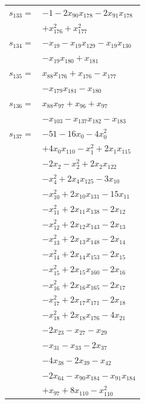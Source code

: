 \begin{longtable}{@{}r@{\;}l@{}}
\(s_{133}=\) & \(\displaystyle -1 -2x_{90}x_{178} -2x_{91}x_{178}\) \\
 & \(\displaystyle +x_{176}^{2} +x_{177}^{2}\) \\[3pt]
\(s_{134}=\) & \(\displaystyle -x_{19} -x_{19}x_{129} -x_{19}x_{130}\) \\
 & \(\displaystyle -x_{19}x_{180} +x_{181}\) \\[3pt]
\(s_{135}=\) & \(\displaystyle x_{88}x_{176} +x_{176} -x_{177}\) \\
 & \(\displaystyle -x_{179}x_{181} -x_{180}\) \\[3pt]
\(s_{136}=\) & \(\displaystyle x_{88}x_{97} +x_{96} +x_{97}\) \\
 & \(\displaystyle -x_{103} -x_{137}x_{182} -x_{183}\) \\[3pt]
\(s_{137}=\) & \(\displaystyle -51 -16x_{0} -4x_{0}^{2}\) \\
 & \(\displaystyle +4x_{0}x_{110} -x_{1}^{2} +2x_{1}x_{115}\) \\
 & \(\displaystyle -2x_{2} -x_{2}^{2} +2x_{2}x_{122}\) \\
 & \(\displaystyle -x_{4}^{2} +2x_{4}x_{125} -3x_{10}\) \\
 & \(\displaystyle -x_{10}^{2} +2x_{10}x_{131} -15x_{11}\) \\
 & \(\displaystyle -x_{11}^{2} +2x_{11}x_{138} -2x_{12}\) \\
 & \(\displaystyle -x_{12}^{2} +2x_{12}x_{143} -2x_{13}\) \\
 & \(\displaystyle -x_{13}^{2} +2x_{13}x_{148} -2x_{14}\) \\
 & \(\displaystyle -x_{14}^{2} +2x_{14}x_{153} -2x_{15}\) \\
 & \(\displaystyle -x_{15}^{2} +2x_{15}x_{160} -2x_{16}\) \\
 & \(\displaystyle -x_{16}^{2} +2x_{16}x_{165} -2x_{17}\) \\
 & \(\displaystyle -x_{17}^{2} +2x_{17}x_{171} -2x_{18}\) \\
 & \(\displaystyle -x_{18}^{2} +2x_{18}x_{176} -4x_{21}\) \\
 & \(\displaystyle -2x_{23} -x_{27} -x_{29}\) \\
 & \(\displaystyle -x_{31} -x_{33} -2x_{37}\) \\
 & \(\displaystyle -4x_{38} -2x_{39} -x_{42}\) \\
 & \(\displaystyle -2x_{64} -x_{90}x_{184} -x_{91}x_{184}\) \\
 & \(\displaystyle +x_{97} +8x_{110} -x_{110}^{2}\) \\

\end{longtable}
